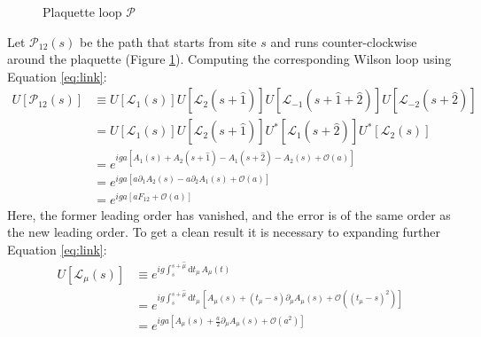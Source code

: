 \begin{figure}[!htb]
    \centering
    \caption{Plaquette loop $\mathcal P$}
    \label{fig:plaq}
\end{figure}
Let $\mathcal P_{12}(s)$ be the path that starts from site $s$ and runs counter-clockwise around the plaquette (Figure \ref{fig:plaq}).
Computing the corresponding Wilson loop using Equation \eqref{eq:link}:
\begin{equation*}
    \begin{aligned}
        U[\mathcal P_{12}(s)] &\equiv U[\mathcal L_{1}(s)] U[\mathcal L_{2}(s+\hat 1)] U[\mathcal L_{-1}(s+\hat 1+\hat 2)] U[\mathcal L_{-2}(s+\hat 2)] \\
                              &= U[\mathcal L_{1}(s)] U[\mathcal L_{2}(s+\hat 1)] U^*[\mathcal L_{1}(s+\hat 2)] U^*[\mathcal L_{2}(s)] \\
                              &= e^{iga[A_1(s) + A_2(s+\hat 1) - A_1(s+\hat 2) - A_2(s) + \mathcal O\left(a\right)]} \\
                              &= e^{iga[a\partial_1A_2(s) - a\partial_2A_1(s) + \mathcal O\left(a\right)]} \\
                              &= e^{iga\left[aF_{12} + \mathcal O\left(a\right)\right]}
    \end{aligned}
\end{equation*}
Here, the former leading order has vanished, and the error is of the same order as the new leading order.
To get a clean result it is necessary to expanding further Equation \eqref{eq:link}:
\begin{equation*}%
    \begin{aligned}
        U[\mathcal L_{\mu}(s)] &\equiv e^{ig\int_s^{s+\hat\mu}\mathrm dt_\mu\,A_\mu(t)} \\
                       &= e^{ig\int_s^{s+\hat\mu}\mathrm dt_\mu\,\left[A_\mu(s) + (t_\mu-s)\partial_\mu A_\mu(s) + \mathcal O\left((t_\mu-s)^2\right)\right]} \\
                       &= e^{iga\left[A_\mu(s) + \frac{a}{2}\partial_\mu A_\mu(s) + \mathcal O\left(a^2\right)\right]} \\
    \end{aligned}
\end{equation*}
